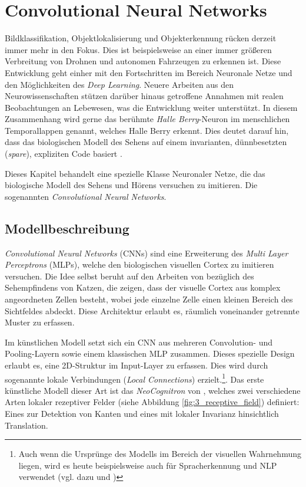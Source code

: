 \section{Convolutional Neural Networks}
Bildklassifikation, Objektlokalisierung und Objekterkennung rücken derzeit immer mehr in den Fokus. Dies ist beispielsweise an einer immer größeren Verbreitung von Drohnen und autonomen Fahrzeugen zu erkennen ist. Diese Entwicklung geht einher mit den Fortschritten im Bereich Neuronale Netze und den Möglichkeiten des \textit{Deep Learning}. Neuere Arbeiten aus den Neurowissenschaften stützen darüber hinaus getroffene Annahmen mit realen Beobachtungen an Lebewesen, was die Entwicklung weiter unterstützt. In diesem Zusammenhang wird gerne das berühmte \textit{Halle Berry}-Neuron im menschlichen Temporallappen genannt, welches Halle Berry erkennt. Dies deutet darauf hin, dass das biologischen Modell des Sehens auf einem invarianten, dünnbesetzten (\textit{spare}), expliziten Code basiert \cite[vgl.][]{Quiroga2005}.

Dieses Kapitel behandelt eine spezielle Klasse Neuronaler Netze, die das biologische Modell des Sehens und Hörens versuchen zu imitieren. Die sogenannten \textit{Convolutional Neural Networks}.

\subsection{Modellbeschreibung}
\label{ch:cnn_model}
\textit{Convolutional Neural Networks} (CNNs) sind eine Erweiterung des \textit{Multi Layer Perceptrons} (MLPs), welche den biologischen visuellen Cortex zu imitieren versuchen. Die Idee selbst beruht auf den Arbeiten von \cite{Wiesel1962} bezüglich des Sehempfindens von Katzen, die zeigen, dass der visuelle Cortex aus komplex angeordneten Zellen besteht, wobei jede einzelne Zelle einen kleinen Bereich des Sichtfeldes abdeckt. Diese Architektur erlaubt es, räumlich voneinander getrennte Muster zu erfassen. 

Im künstlichen Modell setzt sich ein CNN aus mehreren Convolution- und Pooling-Layern sowie einem klassischen MLP zusammen. Dieses spezielle Design erlaubt es, eine 2D-Struktur im Input-Layer zu erfassen. Dies wird durch sogenannte lokale Verbindungen (\textit{Local Connections}) erzielt.\footnote{Auch wenn die Ursprünge des Modells im Bereich der visuellen Wahrnehmung liegen, wird es heute beispielsweise auch für Spracherkennung und NLP verwendet (vgl. dazu \cite{Socher2011} und \cite{Sainatha2015})}.
Das erste künstliche Modell dieser Art ist das \textit{NeoCognitron} von \cite{Fukushima1980}, welches zwei verschiedene Arten lokaler rezeptiver Felder (siehe Abbildung \ref{fig:3_receptive_field}) definiert: Eines zur Detektion von Kanten und eines mit lokaler Invarianz hinsichtlich Translation. 

